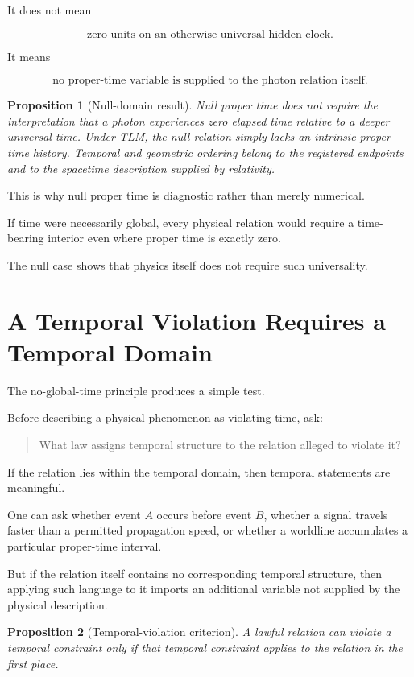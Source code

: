 \documentclass[12pt,onecolumn]{article}
\theoremstyle{plain}
\newtheorem{proposition}{Proposition}
\theoremstyle{definition}
\theoremstyle{remark}
\begin{document}
It does not mean

\[
\text{zero units on an otherwise universal hidden clock}.
\]

It means

\[
\boxed{
\text{no proper-time variable is supplied to the photon relation itself}.
}
\]

\begin{proposition}[Null-domain result]
\label{prop:nulldomain}
Null proper time does not require the interpretation that a photon
experiences zero elapsed time relative to a deeper universal time. Under
TLM, the null relation simply lacks an intrinsic proper-time history.
Temporal and geometric ordering belong to the registered endpoints and to
the spacetime description supplied by relativity.
\end{proposition}

This is why null proper time is diagnostic rather than merely numerical.

If time were necessarily global, every physical relation would require a
time-bearing interior even where proper time is exactly zero.

The null case shows that physics itself does not require such universality.


\section{A Temporal Violation Requires a Temporal Domain}

The no-global-time principle produces a simple test.

Before describing a physical phenomenon as violating time, ask:

\begin{quote}
What law assigns temporal structure to the relation alleged to violate it?
\end{quote}

If the relation lies within the temporal domain, then temporal statements
are meaningful.

One can ask whether event \(A\) occurs before event \(B\), whether a signal
travels faster than a permitted propagation speed, or whether a worldline
accumulates a particular proper-time interval.

But if the relation itself contains no corresponding temporal structure,
then applying such language to it imports an additional variable not
supplied by the physical description.

\begin{proposition}[Temporal-violation criterion]
\label{prop:violation}
A lawful relation can violate a temporal constraint only if that temporal
constraint applies to the relation in the first place.
\end{proposition}
\end{document}

